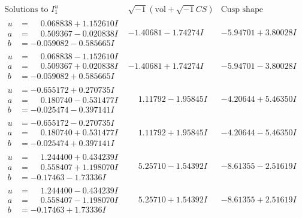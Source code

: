 \documentclass[1p]{elsarticle_modified}
\theoremstyle{definition}
\newcommand{\I}{\sqrt{-1}}
\begin{document}
$$\begin{array}{c|c|c}  
\text{Solutions to }I^u_{1}& \I (\text{vol} + \sqrt{-1}CS) & \text{Cusp shape}\\
 \hline 
\begin{aligned}
u &= \phantom{-}0.068838 + 1.152610 I \\
a &= \phantom{-}0.509367 - 0.020838 I \\
b &= -0.059082 - 0.585665 I\end{aligned}
 & -1.40681 - 1.74274 I & -5.94701 + 3.80028 I \\ \hline\begin{aligned}
u &= \phantom{-}0.068838 - 1.152610 I \\
a &= \phantom{-}0.509367 + 0.020838 I \\
b &= -0.059082 + 0.585665 I\end{aligned}
 & -1.40681 + 1.74274 I & -5.94701 - 3.80028 I \\ \hline\begin{aligned}
u &= -0.655172 + 0.270735 I \\
a &= \phantom{-}0.180740 - 0.531477 I \\
b &= -0.025474 - 0.397141 I\end{aligned}
 & \phantom{-}1.11792 - 1.95845 I & -4.20644 + 5.46350 I \\ \hline\begin{aligned}
u &= -0.655172 - 0.270735 I \\
a &= \phantom{-}0.180740 + 0.531477 I \\
b &= -0.025474 + 0.397141 I\end{aligned}
 & \phantom{-}1.11792 + 1.95845 I & -4.20644 - 5.46350 I \\ \hline\begin{aligned}
u &= \phantom{-}1.244400 + 0.434239 I \\
a &= \phantom{-}0.558407 + 1.198070 I \\
b &= -0.17463 - 1.73336 I\end{aligned}
 & \phantom{-}5.25710 - 1.54392 I & -8.61355 - 2.51619 I \\ \hline\begin{aligned}
u &= \phantom{-}1.244400 - 0.434239 I \\
a &= \phantom{-}0.558407 - 1.198070 I \\
b &= -0.17463 + 1.73336 I\end{aligned}
 & \phantom{-}5.25710 + 1.54392 I & -8.61355 + 2.51619 I \\ \hline\begin{aligned}

\end{aligned}
\end{array}$$
\end{document}
